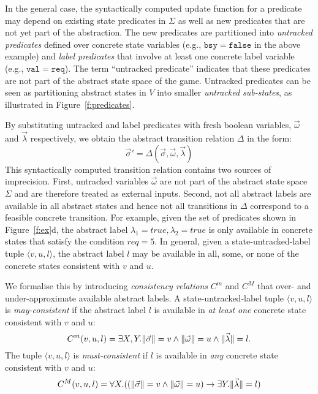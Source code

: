 \documentclass{book}
\newcommand{\vect}[1]{\vec{#1}}
\theoremstyle{definition}
\begin{document}
In the general case, the syntactically computed update function 
for a predicate may depend on existing state predicates in 
$\Sigma$ as well as new predicates that are not yet part of the 
abstraction.  The new predicates are partitioned into 
\emph{untracked predicates} defined over concrete state variables 
(e.g., $\mathtt{bsy=false}$ in the above example) and \emph{label 
predicates} that involve at least one concrete label variable 
(e.g., $\mathtt{val=req}$).  The term ``untracked predicate'' 
indicates that these predicates are not part of the 
abstract state space of the game.  Untracked predicates can be 
seen as partitioning abstract states in $V$ into smaller 
\emph{untracked sub-states}, as illustrated in 
Figure~\ref{f:predicates}.

By substituting untracked and label predicates with fresh boolean 
variables, $\vect{\omega}$ and $\vect{\lambda}$ respectively, we 
obtain the abstract transition relation $\Delta$ in the form:
$$
\vect{\sigma}'=\Delta(\vect{\sigma},\vect{\omega},\vect{\lambda})
$$
This syntactically computed transition relation contains two 
sources of imprecision.  First, untracked variables 
$\vect{\omega}$ are not part of the abstract state space $\Sigma$ 
and are therefore treated as external inputs.  
Second, not all abstract labels  
are available in all abstract states and hence 
not all transitions in $\Delta$ correspond to a feasible concrete 
transition.  For example, given the set of predicates shown in 
Figure~\ref{f:ex}d, the abstract label $\lambda_1 = true, 
\lambda_2 = true$ is only available in concrete states that 
satisfy the condition $req=5$.  In general, given a 
state-untracked-label tuple $\langle v,u,l\rangle$, the abstract 
label $l$ may be available in all, some, or none of the concrete 
states consistent with $v$ and $u$.  

We formalise this by introducing \emph{consistency relations} 
$C^m$ and $C^M$ that over- and under-approximate available 
abstract labels.  A state-untracked-label tuple $\langle 
v,u,l\rangle$ is \emph{may-consistent} if the abstract label $l$ 
is available in \emph{at least one} concrete state consistent with 
$v$ and $u$:
\begin{equation} \label{e:Cm}
    \small
    C^m(v,u,l) = \exists X,Y. \|\vect{\sigma}\|=v \land \|\vect{\omega}\|=u \land \|\vect{\lambda}\|=l.
\end{equation}
The tuple $\langle v,u,l\rangle$ is \emph{must-consistent} if $l$ 
is available in \emph{any} concrete state consistent with $v$ and 
$u$:
\begin{equation}
    \small
    C^M(v,u,l) = \forall X . ((\|\vect{\sigma}\|=v \land \|\vect{\omega}\|=u) \rightarrow \exists Y.  \|\vect{\lambda}\|=l)
\end{equation}
\end{document}

